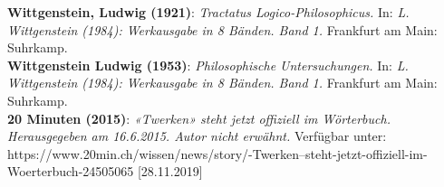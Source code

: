 \documentclass[a4paper,10pt]{article}
\begin{document}
\textbf{Wittgenstein, Ludwig (1921)}: \textit{Tractatus Logico-Philosophicus.} In: \textit{L. Wittgenstein (1984): Werkausgabe in 8 Bänden. Band 1.} Frankfurt am Main: Suhrkamp. \\
\textbf{Wittgenstein Ludwig (1953)}: \textit{Philosophische Untersuchungen.} In: \textit{L. Wittgenstein (1984): Werkausgabe in 8 Bänden. Band 1.} Frankfurt am Main: Suhrkamp. \\
\textbf{20 Minuten (2015)}: \textit{«Twerken» steht jetzt offiziell im Wörterbuch. Herausgegeben am 16.6.2015. Autor nicht erwähnt.} Verfügbar unter: \\ https://www.20min.ch/wissen/news/story/-Twerken--steht-jetzt-offiziell-im-Woerterbuch-24505065  [28.11.2019] \\
\end{document}
